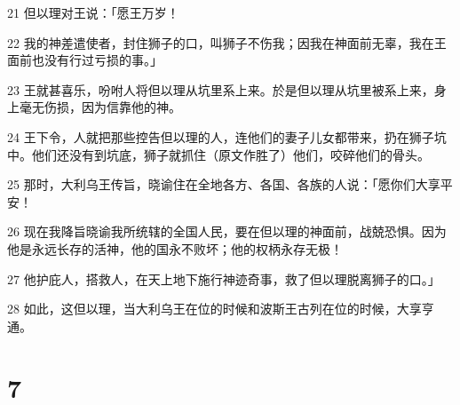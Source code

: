 \par 21 但以理对王说：「愿王万岁！
\par 22 我的神差遣使者，封住狮子的口，叫狮子不伤我；因我在神面前无辜，我在王面前也没有行过亏损的事。」
\par 23 王就甚喜乐，吩咐人将但以理从坑里系上来。於是但以理从坑里被系上来，身上毫无伤损，因为信靠他的神。
\par 24 王下令，人就把那些控告但以理的人，连他们的妻子儿女都带来，扔在狮子坑中。他们还没有到坑底，狮子就抓住（原文作胜了）他们，咬碎他们的骨头。
\par 25 那时，大利乌王传旨，晓谕住在全地各方、各国、各族的人说：「愿你们大享平安！
\par 26 现在我降旨晓谕我所统辖的全国人民，要在但以理的神面前，战兢恐惧。因为他是永远长存的活神，他的国永不败坏；他的权柄永存无极！
\par 27 他护庇人，搭救人，在天上地下施行神迹奇事，救了但以理脱离狮子的口。」
\par 28 如此，这但以理，当大利乌王在位的时候和波斯王古列在位的时候，大享亨通。

\chapter{7}

